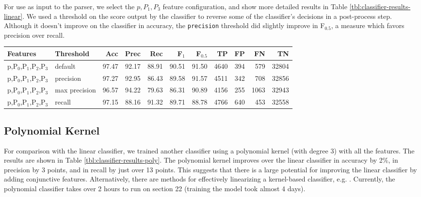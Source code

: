 \documentclass[11pt]{article}
\begin{document}
\label{sec:linear-classifier}
For use as input to the parser, we select the $p,P_{1},P_{3}$
feature configuration, and show more detailed results in
Table \ref{tbl:classifier-results-linear}. We used a threshold on the
score output by the classifier to reverse some of the classifier's
decisions in a post-process step. Although it doesn't improve on the
classifier in accuracy, the \texttt{precision} threshold did slightly improve in
F$_{\text{0.5}}$, a measure which favors precision over recall.

\begin{table*}[htbp]

\begin{tabular}{llrrrrrrrrr}
Features & Threshold & Acc & Prec & Rec & F$_{\text{1}}$ & F$_{\text{0.5}}$ & TP & FP & FN & TN\\
\hline
p,P$_{\text{0}}$,P$_{\text{1}}$,P$_{\text{2}}$,P$_{\text{3}}$ & default & 97.47 & 92.17 & 88.91 & 90.51 & 91.50 & 4640 & 394 & 579 & 32804\\
p,P$_{\text{0}}$,P$_{\text{1}}$,P$_{\text{2}}$,P$_{\text{3}}$ & precision & 97.27 & 92.95 & 86.43 & 89.58 & 91.57 & 4511 & 342 & 708 & 32856\\
p,P$_{\text{0}}$,P$_{\text{1}}$,P$_{\text{2}}$,P$_{\text{3}}$ & max precision & 96.57 & 94.22 & 79.63 & 86.31 & 90.89 & 4156 & 255 & 1063 & 32943\\
p,P$_{\text{0}}$,P$_{\text{1}}$,P$_{\text{2}}$,P$_{\text{3}}$ & recall & 97.15 & 88.16 & 91.32 & 89.71 & 88.78 & 4766 & 640 & 453 & 32558\\
\end{tabular}

\caption{Results of polynomial classifier using different score thresholds.}
\label{tbl:classifier-results-poly}
\end{table*}

\subsection{Polynomial Kernel}
\label{sec-4-5}

\label{sec:poly-classifier} For comparison with the linear classifier,
we trained another classifier using a polynomial kernel (with
degree 3) with all the features. The results are shown in Table
\ref{tbl:classifier-results-poly}. The polynomial kernel improves over
the linear classifier in accuracy by 2\%, in precision by 3 points, and
in recall by just over 13 points. This suggests that there is a large
potential for improving the linear classifier by adding conjunctive
features. Alternatively, there are methods for effectively linearizing
a kernel-based classifier, e.g. \cite{Kudo2003,Isozaki2002}.
Currently, the polynomial classifier takes over 2 hours to run on
section 22 (training the model took almost 4 days).
\end{document}
